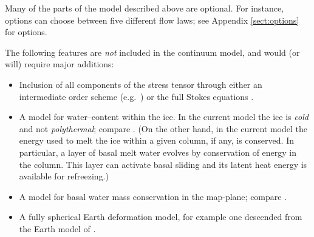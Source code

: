 \documentclass[11pt,final]{amsart}
\begin{document}
Many of the parts of the model described above are optional.  For instance, options can choose between five different flow laws; see Appendix \ref{sect:options} for options.

The following features are \emph{not} included in the continuum model, and would (or will) require major additions:
\begin{itemize}
\item Inclusion of all components of the stress tensor through either an intermediate order scheme (e.g.~\cite{Blatter,Hindmarsh06,Pattyn03}) or the full Stokes equations \cite{Fowler}.
\item A model for water--content within the ice.  In the current model the ice is \emph{cold} and not \emph{polythermal}; compare \cite{Greve}.  (On the other hand, in the current model the energy used to melt the ice within a given column, if any, is conserved.  In particular, a layer of basal melt water evolves by conservation of energy in the column.  This layer can activate basal sliding and its latent heat energy is available for refreezing.)
\item A model for basal water mass conservation in the map-plane; compare \cite{JohnsonFastook}.
\item A fully spherical Earth deformation model, for example one descended from the Earth model of \cite{Peltier}.
\end{itemize}
\end{document}
